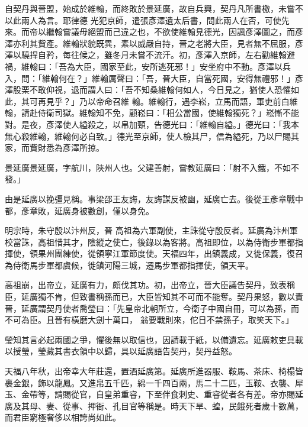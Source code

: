 \begin{pinyinscope}
 自契丹與晉盟，始成於維翰，而終敗於景延廣，故自兵興，契丹凡所書檄，未嘗不以此兩人為言。耶律德
 光犯京師，遣張彥澤遺太后書，問此兩人在否，可使先來。而帝以繼翰嘗議毋絕盟而己違之也，不欲使維翰見德光，因諷彥澤圖之，而彥澤亦利其貲產。維翰狀貌既異，素以威嚴自持，晉之老將大臣，見者無不屈服，彥澤以驍捍自矜，每往候之，雖冬月未嘗不流汗。初，彥澤入京師，左右勸維翰避禍，維翰曰：「吾為大臣，國家至此，安所逃死邪！」安坐府中不動。彥澤以兵入，問：「維翰何在？」維翰厲聲曰：「吾，晉大臣，自當死國，安得無禮邪！」彥澤股栗不敢仰視，退而謂人曰：「吾不知桑維翰何如人，今日見之，猶使人恐懼如此，其可再見乎？」乃以帝命召維
 翰。維翰行，遇李崧，立馬而語，軍吏前白維翰，請赴侍衛司獄。維翰知不免，顧崧曰：「相公當國，使維翰獨死？」崧慚不能對。是夜，彥澤使人縊殺之，以帛加頸，告德光曰：「維翰自縊。」德光曰：「我本無心殺維翰，維翰何必自致。」德光至京師，使人檢其尸，信為縊死，乃以尸賜其家，而貲財悉為彥澤所掠。



 景延廣景延廣，字航川，陜州人也。父建善射，嘗教延廣曰：「射不入鐵，不如不發。」



 由是延廣以挽彊見稱。事梁邵王友誨，友誨謀反被幽，延廣亡去。後從王彥章戰中都，彥章敗，延廣身被數創，僅以身免。



 明宗時，朱守殷以汴州反，晉
 高祖為六軍副使，主誅從守殷反者。延廣為汴州軍校當誅，高祖惜其才，陰縱之使亡，後錄以為客將。高祖即位，以為侍衛步軍都指揮使，領果州團練使，從領寧江軍節度使。天福四年，出鎮義成，又徙保義，復召為侍衛馬步軍都虞候，徙鎮河陽三城，遷馬步軍都指揮使，領天平。



 高祖崩，出帝立，延廣有力，頗伐其功。初，出帝立，晉大臣議告契丹，致表稱臣，延廣獨不肯，但致書稱孫而已，大臣皆知其不可而不能奪。契丹果怒，數以責晉，延廣謂契丹使者喬瑩曰：「先皇帝北朝所立，今衛子中國自冊，可以為孫，而不可為臣。且晉有橫磨大劍十萬口，
 翁要戰則來，佗日不禁孫子，取笑天下。」



 瑩知其言必起兩國之爭，懼後無以取信也，因請載于紙，以備遺忘。延廣敕吏具載以授瑩，瑩藏其書衣領中以歸，具以延廣語告契丹，契丹益怒。



 天福八年秋，出帝幸大年莊還，置酒延廣第。延廣所進器服、鞍馬、茶床、椅榻皆裹金銀，飾以龍鳳。又進帛五千匹，綿一千四百兩，馬二十二匹，玉鞍、衣襲、犀玉、金帶等，請賜從官，自皇弟重睿，下至伴食刺史、重睿從者各有差。帝亦賜延廣及其母、妻、從事、押衙、孔目官等稱是。時天下旱、蝗，民餓死者歲十數萬，而君臣窮極奢侈以相誇尚如此。




\end{pinyinscope}
